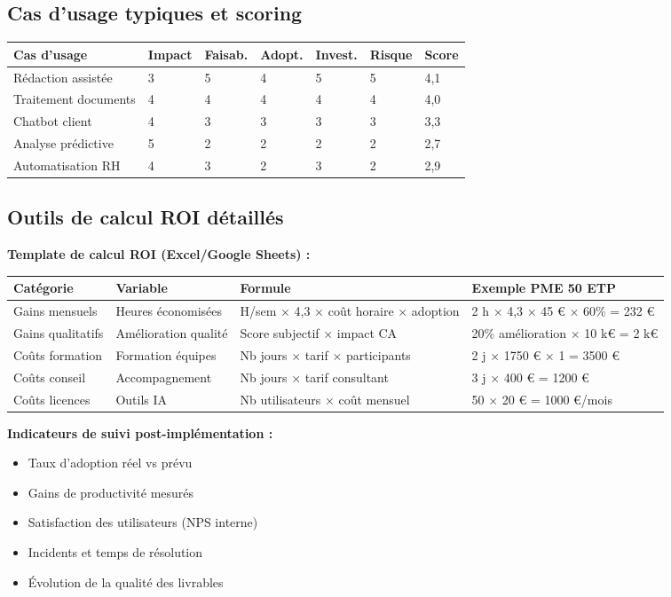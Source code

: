 \subsection{Cas d'usage typiques et scoring}

\begin{longtable}{@{}p{4cm}p{1.5cm}p{1.5cm}p{1.5cm}p{1.5cm}p{1.5cm}p{1.5cm}@{}}
\toprule
\textbf{Cas d'usage} & \textbf{Impact} & \textbf{Faisab.} & \textbf{Adopt.} & \textbf{Invest.} & \textbf{Risque} & \textbf{Score} \\
\midrule
Rédaction assistée & 3 & 5 & 4 & 5 & 5 & 4,1 \\
Traitement documents & 4 & 4 & 4 & 4 & 4 & 4,0 \\
Chatbot client & 4 & 3 & 3 & 3 & 3 & 3,3 \\
Analyse prédictive & 5 & 2 & 2 & 2 & 2 & 2,7 \\
Automatisation RH & 4 & 3 & 2 & 3 & 2 & 2,9 \\
\bottomrule
\end{longtable}

\subsection{Outils de calcul ROI détaillés}

\textbf{Template de calcul ROI (Excel/Google Sheets) :}

\begin{longtable}{@{}p{4cm}p{3cm}p{3cm}p{4cm}@{}}
\toprule
\textbf{Catégorie} & \textbf{Variable} & \textbf{Formule} & \textbf{Exemple PME 50 ETP} \\
\midrule
Gains mensuels & Heures économisées & H/sem × 4,3 × coût horaire × adoption & 2 h × 4,3 × 45 € × 60\% = 232 € \\
Gains qualitatifs & Amélioration qualité & Score subjectif × impact CA & 20\% amélioration × 10 k€ = 2 k€ \\
Coûts formation & Formation équipes & Nb jours × tarif × participants & 2 j × 1750 € × 1 = 3500 € \\
Coûts conseil & Accompagnement & Nb jours × tarif consultant & 3 j × 400 € = 1200 € \\
Coûts licences & Outils IA & Nb utilisateurs × coût mensuel & 50 × 20 € = 1000 €/mois \\
\bottomrule
\end{longtable}

\textbf{Indicateurs de suivi post-implémentation :}
\begin{itemize}
    \item Taux d'adoption réel vs prévu
    \item Gains de productivité mesurés
    \item Satisfaction des utilisateurs (NPS interne)
    \item Incidents et temps de résolution
    \item Évolution de la qualité des livrables
\end{itemize}

